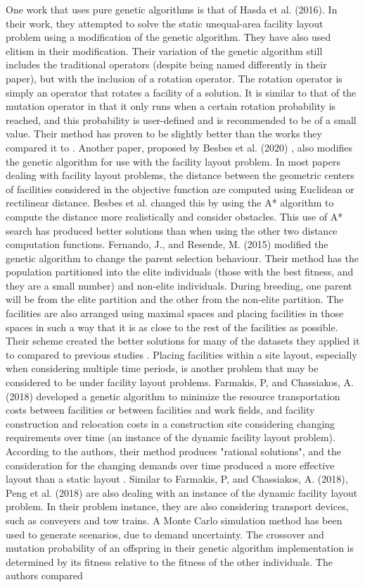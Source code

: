 One work that uses pure genetic algorithms is that of Hasda et al. (2016). In their work, they attempted to solve the static unequal-area facility layout problem using a modification of the genetic algorithm. They have also used elitism in their modification. Their variation of the genetic algorithm still includes the traditional operators (despite being named differently in their paper), but with the inclusion of a rotation operator. The rotation operator is simply an operator that rotates a facility of a solution. It is similar to that of the mutation operator in that it only runs when a certain rotation probability is reached, and this probability is user-defined and is recommended to be of a small value. Their method has proven to be slightly better than the works they compared it to \cite{Hasda2017}. Another paper, proposed by Besbes et al. (2020) \cite{Besbes2020}, also modifies the genetic algorithm for use with the facility layout problem. In most papers dealing with facility layout problems, the distance between the geometric centers of facilities considered in the objective function are computed using Euclidean or rectilinear distance. Besbes et al. changed this by using the A* algorithm to compute the distance more realistically and consider obstacles. This use of A* search has produced better solutions than when using the other two distance computation functions. Fernando, J., and Resende, M. (2015) modified the genetic algorithm to change the parent selection behaviour. Their method has the population partitioned into the elite individuals (those with the best fitness, and they are a small number) and non-elite individuals. During breeding, one parent will be from the elite partition and the other from the non-elite partition. The facilities are also arranged using maximal spaces and placing facilities in those spaces in such a way that it is as close to the rest of the facilities as possible. Their scheme created the better solutions for many of the datasets they applied it to compared to previous studies \cite{Fernando2015}. Placing facilities within a site layout, especially when considering multiple time periods, is another problem that may be considered to be under facility layout problems. Farmakis, P, and Chassiakos, A. (2018) developed a genetic algorithm to minimize the resource transportation costs between facilities or between facilities and work fields, and facility construction and relocation costs in a construction site considering changing requirements over time (an instance of the dynamic facility layout problem). According to the authors, their method produces "rational solutions", and the consideration for the changing demands over time produced a more effective layout than a static layout \cite{Farmakis2018}. Similar to Farmakis, P, and Chassiakos, A. (2018), Peng et al. (2018) are also dealing with an instance of the dynamic facility layout problem. In their problem instance, they are also considering transport devices, such as conveyers and tow trains. A Monte Carlo simulation method has been used to generate scenarios, due to demand uncertainty. The crossover and mutation probability of an offspring in their genetic algorithm implementation is determined by its fitness relative to the fitness of the other individuals. The authors compared 